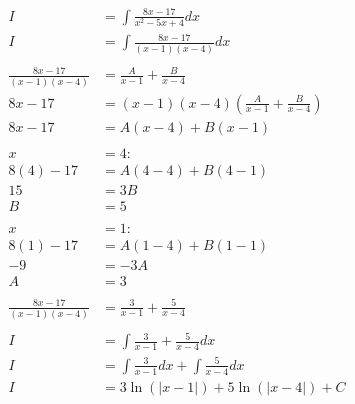 \documentclass[12pt]{article}
\begin{document}
\begin{align}
    I                        & = \int \frac{8x-17}{x^2-5x+4} dx                       \\
    I                        & = \int \frac{8x-17}{(x-1)(x-4)} dx                     \\
    \nonumber                                                                         \\
    \frac{8x-17}{(x-1)(x-4)} & = \frac{A}{x-1} + \frac{B}{x-4}                        \\
    8x-17                    & = (x-1)(x-4)\left(\frac{A}{x-1} + \frac{B}{x-4}\right) \\
    8x-17                    & = A(x-4) + B(x-1)                                      \\
    \nonumber                                                                         \\
    x                        & =4:                                                    \\
    8(4)-17                  & = A(4-4) + B(4-1)                                      \\
    15                       & = 3B                                                   \\
    B                        & = 5                                                    \\
    \nonumber                                                                         \\
    x                        & =1:                                                    \\
    8(1)-17                  & = A(1-4) + B(1-1)                                      \\
    -9                       & = -3A                                                  \\
    A                        & = 3                                                    \\
    \nonumber                                                                         \\
    \frac{8x-17}{(x-1)(x-4)} & = \frac{3}{x-1} + \frac{5}{x-4}                        \\
    \nonumber                                                                         \\
    I                        & = \int \frac{3}{x-1} + \frac{5}{x-4} dx                \\
    I                        & = \int \frac{3}{x-1} dx + \int \frac{5}{x-4} dx        \\
    I                        & = 3\ln(|x-1|) + 5\ln(|x-4|) + C
\end{align}
\end{document}
